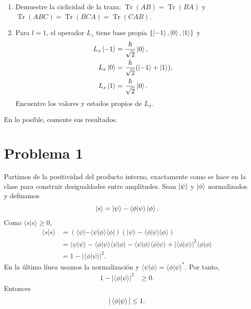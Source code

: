 \documentclass[11pt,a4paper]{article}
\numberwithin{equation}{section}
\renewcommand{\boxed}[1]{#1}
\begin{document}
\begin{enumerate}[label=\arabic*.-]
\begin{align}
\end{align}
\item Demuestre la ciclicidad de la traza: $\operatorname{Tr}(AB)=\operatorname{Tr}(BA)$ y $\operatorname{Tr}(ABC)=\operatorname{Tr}(BCA)=\operatorname{Tr}(CAB)$.
\item Para $l=1$, el operador $L_z$ tiene base propia $\{\ket{-1},\ket0,\ket1\}$ y
\begin{align}
L_x\ket{-1}&=\frac{\hbar}{\sqrt2}\ket0,\\
L_x\ket0&=\frac{\hbar}{\sqrt2}(\ket{-1}+\ket1),\\
L_x\ket1&=\frac{\hbar}{\sqrt2}\ket0.
\end{align}
Encuentre los valores y estados propios de $L_x$.
\end{enumerate}
En lo posible, comente sus resultados.


\section{Problema 1}
Partimos de la positividad del producto interno, exactamente como se hace en la clase para construir desigualdades entre amplitudes. Sean $\ket\psi$ y $\ket\phi$ normalizados y definamos
\begin{equation}
\ket s=\ket\psi-\braket{\phi|\psi}\ket\phi.
\end{equation}
Como $\langle s|s\rangle\ge0$,
\begin{align}
\langle s|s\rangle
&=(\langle\psi|-\langle\psi|\phi\rangle\langle\phi|)
(|\psi\rangle-\langle\phi|\psi\rangle|\phi\rangle)\\
&=\langle\psi|\psi\rangle
-\langle\phi|\psi\rangle\langle\psi|\phi\rangle
-\langle\psi|\phi\rangle\langle\phi|\psi\rangle
+|\langle\phi|\psi\rangle|^2\langle\phi|\phi\rangle\\
&=1-|\langle\phi|\psi\rangle|^2.
\end{align}
En la última línea usamos la normalización y $\langle\psi|\phi\rangle=\langle\phi|\psi\rangle^*$. Por tanto,
\begin{align}
1-|\langle\phi|\psi\rangle|^2&\ge0.
\end{align}
Entonces
\begin{equation}
\boxed{|\braket{\phi|\psi}|\le1.}
\end{equation}
\end{document}
